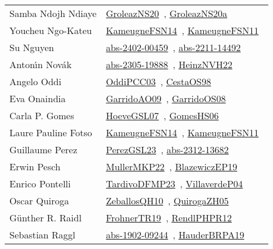 {\begin{longtable}{p{4cm}p{20cm}}
Samba Ndojh Ndiaye & \href{papers/GroleazNS20.pdf}{GroleazNS20}~\cite{GroleazNS20}, \href{papers/GroleazNS20a.pdf}{GroleazNS20a}~\cite{GroleazNS20a}\\
Youcheu Ngo{-}Kateu & \href{articles/KameugneFSN14.pdf}{KameugneFSN14}~\cite{KameugneFSN14}, \href{papers/KameugneFSN11.pdf}{KameugneFSN11}~\cite{KameugneFSN11}\\
Su Nguyen & \href{articles/abs-2402-00459.pdf}{abs-2402-00459}~\cite{abs-2402-00459}, \href{articles/abs-2211-14492.pdf}{abs-2211-14492}~\cite{abs-2211-14492}\\
Anton{\'{\i}}n Nov{\'{a}}k & \href{articles/abs-2305-19888.pdf}{abs-2305-19888}~\cite{abs-2305-19888}, \href{articles/HeinzNVH22.pdf}{HeinzNVH22}~\cite{HeinzNVH22}\\
Angelo Oddi & \href{papers/OddiPCC03.pdf}{OddiPCC03}~\cite{OddiPCC03}, \href{papers/CestaOS98.pdf}{CestaOS98}~\cite{CestaOS98}\\
Eva Onaindia & \href{articles/GarridoAO09.pdf}{GarridoAO09}~\cite{GarridoAO09}, \href{articles/GarridoOS08.pdf}{GarridoOS08}~\cite{GarridoOS08}\\
Carla P. Gomes & \href{papers/HoeveGSL07.pdf}{HoeveGSL07}~\cite{HoeveGSL07}, \href{papers/GomesHS06.pdf}{GomesHS06}~\cite{GomesHS06}\\
Laure Pauline Fotso & \href{articles/KameugneFSN14.pdf}{KameugneFSN14}~\cite{KameugneFSN14}, \href{papers/KameugneFSN11.pdf}{KameugneFSN11}~\cite{KameugneFSN11}\\
Guillaume Perez & \href{papers/PerezGSL23.pdf}{PerezGSL23}~\cite{PerezGSL23}, \href{articles/abs-2312-13682.pdf}{abs-2312-13682}~\cite{abs-2312-13682}\\
Erwin Pesch & \href{articles/MullerMKP22.pdf}{MullerMKP22}~\cite{MullerMKP22}, \href{}{BlazewiczEP19}~\cite{BlazewiczEP19}\\
Enrico Pontelli & \href{papers/TardivoDFMP23.pdf}{TardivoDFMP23}~\cite{TardivoDFMP23}, \href{}{VillaverdeP04}~\cite{VillaverdeP04}\\
Oscar Quiroga & \href{articles/ZeballosQH10.pdf}{ZeballosQH10}~\cite{ZeballosQH10}, \href{papers/QuirogaZH05.pdf}{QuirogaZH05}~\cite{QuirogaZH05}\\
G{\"{u}}nther R. Raidl & \href{papers/FrohnerTR19.pdf}{FrohnerTR19}~\cite{FrohnerTR19}, \href{papers/RendlPHPR12.pdf}{RendlPHPR12}~\cite{RendlPHPR12}\\
Sebastian Raggl & \href{articles/abs-1902-09244.pdf}{abs-1902-09244}~\cite{abs-1902-09244}, \href{articles/HauderBRPA19.pdf}{HauderBRPA19}~\cite{HauderBRPA19}\\

\end{longtable}}
